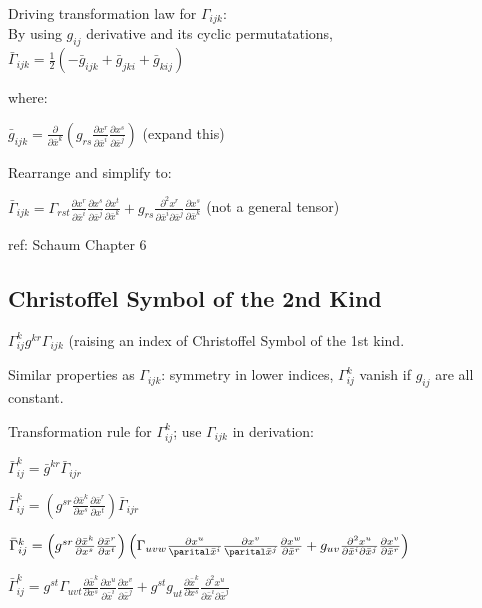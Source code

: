 \documentclass[8pt,letter]{article}
\begin{document}
\begin{multicols*}{2}
  Driving transformation law for $\Gamma_{ijk}$:\\
  By using $g_{ij}$ derivative and its cyclic permutatations,\\
  $\bar{\Gamma}_{ijk} = \frac{1}{2}( -\bar{g}_{ijk} + \bar{g}_{jki} + \bar{g}_{kij})$

  where:
  
  $\bar{g}_{ijk} = \frac{\partial}{\partial \bar{x}^k} \left(g_{rs} \frac{\partial x^r}{\partial \bar{x}^i} \frac{\partial x^s}{\partial \bar{x}^j}\right)$ (expand this)

  Rearrange and simplify to:

  $\bar{\Gamma}_{ijk} = \Gamma_{rst} \frac{\partial x^r}{\partial \bar{x}^i} \frac{\partial x^s}{\partial \bar{x}^j} \frac{\partial x^t}{\partial \bar{x}^k} + g_{rs} \frac{\partial^2 x^r}{\partial \bar{x}^i \partial \bar{x}^j} \frac{\partial x^s}{\partial \bar{x}^k}$ (not a general tensor)

  ref: Schaum Chapter 6
  
  \subsection{Christoffel Symbol of the 2nd Kind}

  $\Gamma_{ij}^k g^{kr} \Gamma_{ijk}$ (raising an index of Christoffel Symbol of the 1st kind.

  Similar properties as $\Gamma_{ijk}$: symmetry in lower indices, $\Gamma_{ij}^k$ vanish if $g_{ij}$ are all constant.
  
  Transformation rule for $\Gamma_{ij}^k$; use $\Gamma_{ijk}$ in derivation:
  
  $\bar{\Gamma}_{ij}^k = \bar{g}^{kr} \bar{\Gamma}_{ijr}$

  $\bar{\Gamma}_{ij}^k = \left(g^{sr} \frac{\partial \bar{x}^k}{\partial x^s} \frac{\partial \bar{x}^r}{\partial x^t}\right) \bar{\Gamma}_{ijr}$

  $\bar{\Gamma}_{ij}^k = \left(g^{sr} \frac{\partial \bar{x}^k}{\partial x^s} \frac{\partial \bar{x}^r}{\partial x^t}\right) \left(\Gamma_{uvw} \frac{\partial x^u}{\parital \bar{x}^i} \frac{\partial x^v}{\parital \bar{x}^j} \frac{\partial x^w}{\partial \bar{x}^r} + g_{uv} \frac{\partial^2 x^u}{\partial \bar{x}^i \partial \bar{x}^j} \frac{\partial x^v}{\partial \bar{x}^r} \right)$

  $\bar{\Gamma}_{ij}^k = g^{st} \Gamma_{uvt} \frac{\partial \bar{x}^k}{\partial x^s} \frac{\partial x^u}{\partial \bar{x}^i} \frac{\partial x^v}{\partial \bar{x}^j} + g^{st} g_{ut} \frac{\partial \bar{x}^k}{\partial x^s} \frac{\partial^2 x^u}{\partial \bar{x}^i \partial \bar{x}^j}$


\end{multicols*}
\end{document}
